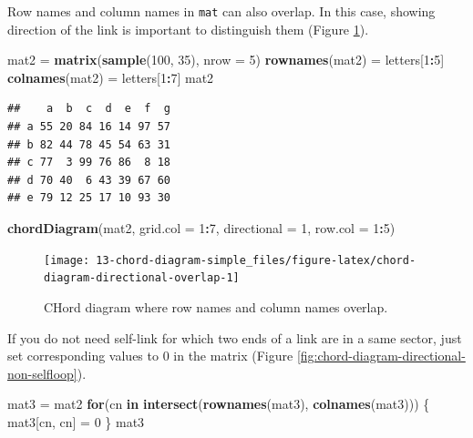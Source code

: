 \documentclass[]{book}
\newenvironment{Shaded}{\begin{snugshade}}{\end{snugshade}}
\newcommand{\KeywordTok}[1]{\textcolor[rgb]{0.13,0.29,0.53}{\textbf{#1}}}
\newcommand{\DataTypeTok}[1]{\textcolor[rgb]{0.13,0.29,0.53}{#1}}
\newcommand{\DecValTok}[1]{\textcolor[rgb]{0.00,0.00,0.81}{#1}}
\newcommand{\StringTok}[1]{\textcolor[rgb]{0.31,0.60,0.02}{#1}}
\newcommand{\ControlFlowTok}[1]{\textcolor[rgb]{0.13,0.29,0.53}{\textbf{#1}}}
\newcommand{\OperatorTok}[1]{\textcolor[rgb]{0.81,0.36,0.00}{\textbf{#1}}}
\newcommand{\NormalTok}[1]{#1}
\theoremstyle{definition}
\theoremstyle{definition}
\theoremstyle{remark}
\begin{document}
Row names and column names in \texttt{mat} can also overlap. In this
case, showing direction of the link is important to distinguish them
(Figure \ref{fig:chord-diagram-directional-overlap}).

\begin{Shaded}
\begin{Highlighting}[]
\NormalTok{mat2 =}\StringTok{ }\KeywordTok{matrix}\NormalTok{(}\KeywordTok{sample}\NormalTok{(}\DecValTok{100}\NormalTok{, }\DecValTok{35}\NormalTok{), }\DataTypeTok{nrow =} \DecValTok{5}\NormalTok{)}
\KeywordTok{rownames}\NormalTok{(mat2) =}\StringTok{ }\NormalTok{letters[}\DecValTok{1}\OperatorTok{:}\DecValTok{5}\NormalTok{]}
\KeywordTok{colnames}\NormalTok{(mat2) =}\StringTok{ }\NormalTok{letters[}\DecValTok{1}\OperatorTok{:}\DecValTok{7}\NormalTok{]}
\NormalTok{mat2}
\end{Highlighting}
\end{Shaded}

\begin{verbatim}
##    a  b  c  d  e  f  g
## a 55 20 84 16 14 97 57
## b 82 44 78 45 54 63 31
## c 77  3 99 76 86  8 18
## d 70 40  6 43 39 67 60
## e 79 12 25 17 10 93 30
\end{verbatim}

\begin{Shaded}
\begin{Highlighting}[]
\KeywordTok{chordDiagram}\NormalTok{(mat2, }\DataTypeTok{grid.col =} \DecValTok{1}\OperatorTok{:}\DecValTok{7}\NormalTok{, }\DataTypeTok{directional =} \DecValTok{1}\NormalTok{, }\DataTypeTok{row.col =} \DecValTok{1}\OperatorTok{:}\DecValTok{5}\NormalTok{)}
\end{Highlighting}
\end{Shaded}

\begin{figure}

{\centering \texttt{[image: 13-chord-diagram-simple\_files/figure-latex/chord-diagram-directional-overlap-1]} 

}

\caption{CHord diagram where row names and column names overlap.}\label{fig:chord-diagram-directional-overlap}
\end{figure}

If you do not need self-link for which two ends of a link are in a same
sector, just set corresponding values to 0 in the matrix (Figure
\ref{fig:chord-diagram-directional-non-selfloop}).

\begin{Shaded}
\begin{Highlighting}[]
\NormalTok{mat3 =}\StringTok{ }\NormalTok{mat2}
\ControlFlowTok{for}\NormalTok{(cn }\ControlFlowTok{in} \KeywordTok{intersect}\NormalTok{(}\KeywordTok{rownames}\NormalTok{(mat3), }\KeywordTok{colnames}\NormalTok{(mat3))) \{}
\NormalTok{    mat3[cn, cn] =}\StringTok{ }\DecValTok{0}
\NormalTok{\}}
\NormalTok{mat3}
\end{Highlighting}
\end{Shaded}
\end{document}
